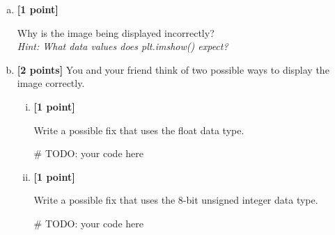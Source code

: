\documentclass[11pt]{article}
\begin{document}
\begin{enumerate} [(a)]
    \item \textbf{[1 point]}
\begin{tcolorbox}[colback=orange!5!white,colframe=orange!75!black]
Why is the image being displayed incorrectly?\\
\emph{Hint: What data values does plt.imshow() expect?}
\end{tcolorbox}


\item \textbf{[2 points]} You and your friend think of two possible ways to display the image correctly.
\begin{enumerate} [(i)]

\item \textbf{[1 point]}
\begin{tcolorbox}[colback=orange!5!white,colframe=orange!75!black]
Write a possible fix that uses the float data type.
\end{tcolorbox}

\begin{tcolorbox}[colback=white!5!white,colframe=green!75!black, height=4cm]
    \begin{python}
    # TODO: your code here
    \end{python}
\end{tcolorbox}


\pagebreak
\item \textbf{[1 point]}
\begin{tcolorbox}[colback=orange!5!white,colframe=orange!75!black]
Write a possible fix that uses the 8-bit unsigned integer data type.
\end{tcolorbox}

\begin{tcolorbox}[colback=white!5!white,colframe=green!75!black, height=4cm]
    \begin{python}
    # TODO: your code here
    \end{python}
\end{tcolorbox}
\end{enumerate}


\end{enumerate}
\end{document}
